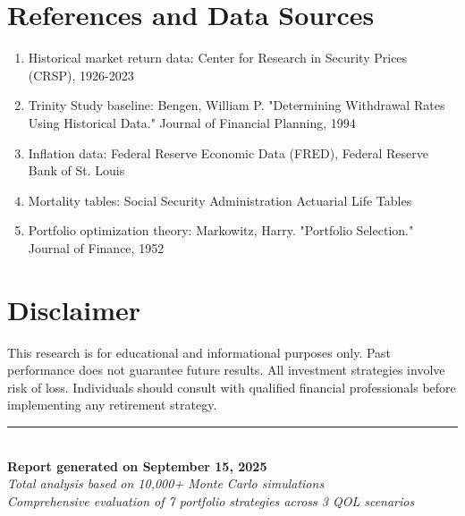 \documentclass[11pt,letterpaper]{article}
\begin{document}
\section*{References and Data Sources}

\begin{enumerate}[leftmargin=*]
    \item Historical market return data: Center for Research in Security Prices (CRSP), 1926-2023
    \item Trinity Study baseline: Bengen, William P. "Determining Withdrawal Rates Using Historical Data." Journal of Financial Planning, 1994
    \item Inflation data: Federal Reserve Economic Data (FRED), Federal Reserve Bank of St. Louis
    \item Mortality tables: Social Security Administration Actuarial Life Tables
    \item Portfolio optimization theory: Markowitz, Harry. "Portfolio Selection." Journal of Finance, 1952
\end{enumerate}

\section*{Disclaimer}

This research is for educational and informational purposes only. Past performance does not guarantee future results. All investment strategies involve risk of loss. Individuals should consult with qualified financial professionals before implementing any retirement strategy.

\vfill
\begin{center}
\rule{0.8\textwidth}{0.4pt}\\
\textbf{Report generated on September 15, 2025}\\
\textit{Total analysis based on 10,000+ Monte Carlo simulations}\\
\textit{Comprehensive evaluation of 7 portfolio strategies across 3 QOL scenarios}
\end{center}
\end{document}

